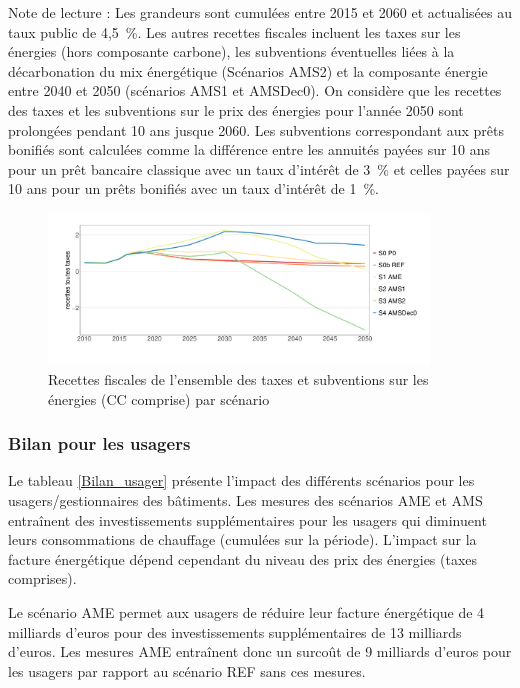 \documentclass[10.5pt,a4paper]{article}
\begin{document}
{\begin{table}[h]
\footnotesize{Note de lecture : Les grandeurs sont cumulées entre 2015 et 2060 et actualisées au taux public de 4,5~\%.  Les autres recettes fiscales incluent les taxes sur les énergies (hors composante carbone), les subventions éventuelles liées à la décarbonation du mix énergétique (Scénarios AMS2) et la composante énergie entre 2040 et 2050 (scénarios AMS1 et AMSDec0). On considère que les recettes des taxes et les subventions sur le prix des énergies pour l'année 2050 sont prolongées pendant 10 ans jusque 2060. Les subventions correspondant aux prêts bonifiés sont calculées comme la différence entre les annuités payées sur 10 ans pour un prêt bancaire classique avec un taux d'intérêt de 3~\% et celles payées sur 10 ans pour un prêts bonifiés avec un taux d'intérêt de 1~\%.}
\end{table}

% 

\begin{figure}[h!]
\centering 
\caption{Recettes fiscales de l'ensemble des taxes et subventions sur les énergies (CC comprise) par scénario }\label{Evol_Recettes_taxes-1}  
\includegraphics[width = 0.9\textwidth]{Evol_Recettes_taxes-1}  
\end{figure}

\clearpage 

\subsubsection{Bilan pour les usagers}
%
Le tableau \ref{Bilan_usager} présente l'impact des différents scénarios pour les usagers/gestionnaires des bâtiments. Les mesures des scénarios AME et AMS entraînent des investissements supplémentaires pour les usagers qui diminuent leurs consommations de chauffage (cumulées sur la période). L'impact sur la facture énergétique dépend cependant du niveau des prix des énergies (taxes comprises). 

Le scénario AME permet aux usagers de réduire leur facture énergétique de 4 milliards d'euros pour des investissements supplémentaires de 13 milliards d'euros. Les mesures AME entraînent donc un surcoût de 9 milliards d'euros pour les usagers par rapport au scénario REF sans ces mesures.

}
\end{document}
